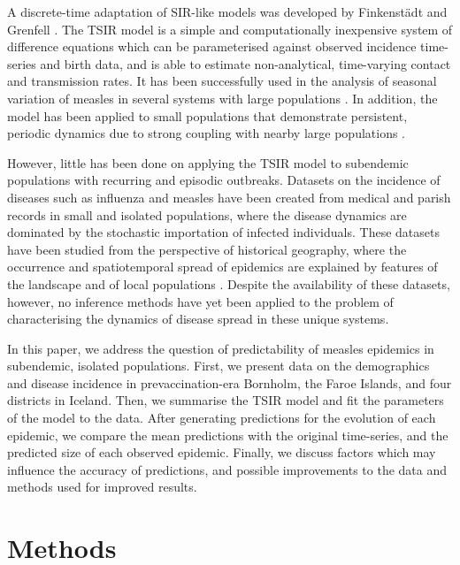 \documentclass[10pt]{article}
\begin{document}
A discrete-time adaptation of SIR-like models was developed by Finkenst\"{a}dt and Grenfell \cite{Finkenstadt2000}. The TSIR model is a simple and computationally inexpensive system of difference equations which can be parameterised against observed incidence time-series and birth data, and is able to estimate non-analytical, time-varying contact and transmission rates. It has been successfully used in the analysis of seasonal variation of measles in several systems with large populations \cite{Glass2003, Metcalf2010}. In addition, the model has been applied to small populations that demonstrate persistent, periodic dynamics due to strong coupling with nearby large populations \cite{Grenfell2002, Bjornstad2002}. 

However, little has been done on applying the TSIR model to subendemic populations with recurring and episodic outbreaks. Datasets on the incidence of diseases such as influenza and measles have been created from medical and parish records in small and isolated populations, where the disease dynamics are dominated by the stochastic importation of infected individuals. These datasets have been studied from the perspective of historical geography, where the occurrence and spatiotemporal spread of epidemics are explained by features of the landscape and of local populations \cite{Cliff1981, Cliff2000}. Despite the availability of these datasets, however, no inference methods have yet been applied to the problem of characterising the dynamics of disease spread in these unique systems.

In this paper, we address the question of predictability of measles epidemics in subendemic, isolated populations. First, we present data on the demographics and disease incidence in prevaccination-era Bornholm, the Faroe Islands, and four districts in Iceland. Then, we summarise the TSIR model and fit the parameters of the model to the data. After generating predictions for the evolution of each epidemic, we compare the mean predictions with the original time-series, and the predicted size of each observed epidemic. Finally, we discuss factors which may influence the accuracy of predictions, and possible improvements to the data and methods used for improved results.














\section*{Methods}
\end{document}
